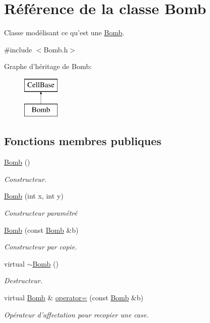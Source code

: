 \hypertarget{class_bomb}{\section{Référence de la classe Bomb}
\label{class_bomb}
}


Classe modélisant ce qu'est une \hyperlink{class_bomb}{Bomb}.  




{\ttfamily \#include $<$Bomb.\-h$>$}

Graphe d'héritage de Bomb\-:\begin{figure}[H]
\begin{center}
\leavevmode
\includegraphics[height=2.000000cm]{class_bomb}
\end{center}
\end{figure}
\subsection*{Fonctions membres publiques}
\begin{DoxyCompactItemize}
\item 
\hyperlink{class_bomb_a5805401b6cfbb451cf31ebd4851740cf}{Bomb} ()
\begin{DoxyCompactList}\small\item\em Constructeur. \end{DoxyCompactList}\item 
\hyperlink{class_bomb_a318b2684bf1c574999874a943478b264}{Bomb} (int x, int y)
\begin{DoxyCompactList}\small\item\em Constructeur paramétré \end{DoxyCompactList}\item 
\hyperlink{class_bomb_a4819197ccba9c9d0e5dc0176baf1e9b2}{Bomb} (const \hyperlink{class_bomb}{Bomb} \&b)
\begin{DoxyCompactList}\small\item\em Constructeur par copie. \end{DoxyCompactList}\item 
virtual \hyperlink{class_bomb_acbb47327cfb2fa429887774ef3597965}{$\sim$\-Bomb} ()
\begin{DoxyCompactList}\small\item\em Destructeur. \end{DoxyCompactList}\item 
virtual \hyperlink{class_bomb}{Bomb} \& \hyperlink{class_bomb_a5b76072fc1f9ee0755823afe65b77db9}{operator=} (const \hyperlink{class_bomb}{Bomb} \&b)
\begin{DoxyCompactList}\small\item\em Opérateur d'affectation pour recopier une case. \end{DoxyCompactList}\end{DoxyCompactItemize}
